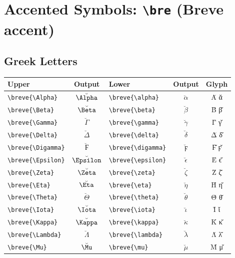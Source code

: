 \documentclass[12pt,a4paper]{article}
\begin{document}
\section*{Accented Symbols: \texttt{\textbackslash bre} (Breve accent)}

\subsection*{Greek Letters}
\begin{longtable}{|l|c|l|c|c|}
\hline
\textbf{Upper}             & \textbf{Output}    & \textbf{Lower}             & \textbf{Output}       & \textbf{Glyph} \\
\hline
\verb|\breve{\Alpha}|      & $\breve{\Alpha}$   & \verb|\breve{\alpha}|      & $\breve{\alpha}$      & Ᾰ ᾰ \\
\verb|\breve{\Beta}|       & $\breve{\Beta}$    & \verb|\breve{\beta}|       & $\breve{\beta}$       & Β̆ β̆ \\
\verb|\breve{\Gamma}|      & $\breve{\Gamma}$   & \verb|\breve{\gamma}|      & $\breve{\gamma}$      & Γ̆ γ̆ \\
\verb|\breve{\Delta}|      & $\breve{\Delta}$   & \verb|\breve{\delta}|      & $\breve{\delta}$      & Δ̆ δ̆ \\
\verb|\breve{\Digamma}|    & $\breve{\Digamma}$ & \verb|\breve{\digamma}|    & $\breve{\digamma}$    & Ϝ̆ ϝ̆ \\
\verb|\breve{\Epsilon}|    & $\breve{\Epsilon}$ & \verb|\breve{\epsilon}|    & $\breve{\epsilon}$    & Ε̆ ϵ̆ \\
\verb|\breve{\Zeta}|       & $\breve{\Zeta}$    & \verb|\breve{\zeta}|       & $\breve{\zeta}$       & Ζ̆ ζ̆ \\
\verb|\breve{\Eta}|        & $\breve{\Eta}$     & \verb|\breve{\eta}|        & $\breve{\eta}$        & Η̆ η̆ \\
\verb|\breve{\Theta}|      & $\breve{\Theta}$   & \verb|\breve{\theta}|      & $\breve{\theta}$      & Θ̆ θ̆ \\
\verb|\breve{\Iota}|       & $\breve{\Iota}$    & \verb|\breve{\iota}|       & $\breve{\iota}$       & Ῐ ῐ \\
\verb|\breve{\Kappa}|      & $\breve{\Kappa}$   & \verb|\breve{\kappa}|      & $\breve{\kappa}$      & Κ̆ κ̆ \\
\verb|\breve{\Lambda}|     & $\breve{\Lambda}$  & \verb|\breve{\lambda}|     & $\breve{\lambda}$     & Λ̆ λ̆ \\
\verb|\breve{\Mu}|         & $\breve{\Mu}$      & \verb|\breve{\mu}|         & $\breve{\mu}$         & Μ̆ μ̆ \\

\end{longtable}
\end{document}
